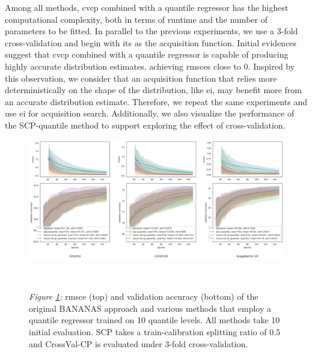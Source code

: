 \documentclass[a4paper,oneside,bibliography=totoc]{scrbook}
\begin{document}
\begin{description}[leftmargin=0cm, listparindent=\parindent]
 	\item[Performance for \gls{cvcp}:] Among all methods, \gls{cvcp} combined with a quantile regressor has the highest computational complexity, both in terms of runtime and the number of parameters to be fitted. In parallel to the previous experiments, we use a 3-fold cross-validation and begin with \gls{its} as the acquisition function. Initial evidences suggest that \gls{cvcp} combined with a quantile regressor is capable of producing highly accurate distribution estimates, achieving \gls{rmsce}s close to 0. Inspired by this observation, we consider that an acquisition function that relies more deterministically on the shape of the distribution, like \gls{ei}, may benefit more from an accurate distribution estimate. Therefore, we repeat the same experiments and use \gls{ei} for acquisition search. Additionally, we also visualize the performance of the SCP-quantile method to support exploring the effect of cross-validation.
 	
 	    \vspace{0.7em}
		\begin{figure}[H]
			\centering
			\includegraphics[scale=0.37 ]{figs/cvcp_quantile.png}
			\label{fig: cvcp_quantile}
			\\
 			\parbox{\linewidth}{
 			\vspace{0.5em}
  			{\small \textit{Figure \ref{fig: cvcp_quantile}:} \gls{rmsce} (top) and validation accuracy (bottom) of the original BANANAS approach and various methods that employ a quantile regressor trained on 10 quantile levels. All methods take 10 initial evaluation. SCP takes a train-calibration splitting ratio of 0.5 and CrossVal-CP is evaluated under 3-fold cross-validation.}
 	 	}	
		\end{figure}	
 	\vspace{0.2em}
 	

\end{description}
\end{document}
